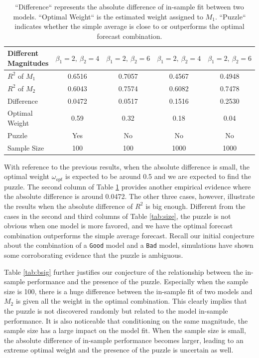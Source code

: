 \documentclass{monashthesis}
\begin{document}
\begin{table}[ht]
  \centering
    \begin{tabular}{l|cccc}
    \toprule
    Different Magnitudes    &  $\beta_1=2,\ \beta_2=4$   &  $\beta_1=2,\ \beta_2=6$ &  $\beta_1=2,\ \beta_2=4$  &  $\beta_1=2,\ \beta_2=6$  \\
    \midrule
    $R^2$ of $M_1$  &    0.6516    &   0.7057   &    0.4567     &   0.4948   \\
    $R^2$ of $M_2$  &    0.6043    &   0.7574   &    0.6082     &   0.7478   \\
    Difference      &    0.0472    &   0.0517   &    0.1516     &   0.2530   \\
    Optimal Weight  &     0.59     &    0.32    &     0.18      &    0.04    \\
    Puzzle          &     Yes      &     No     &      No       &     No     \\
    Sample Size     &     100      &    100     &     1000      &    1000    \\
    \bottomrule
    \end{tabular}
  \caption{``Difference`` represents the absolute difference of in-sample fit between two models. ``Optimal Weight`` is the estimated weight assigned to $M_1$. ``Puzzle`` indicates whether the simple average is close to or outperforms the optimal forecast combination.}
  \label{tab:bmag}
\end{table}

With reference to the previous results, when the absolute difference is small, the optimal weight \(\omega_{opt}\) is expected to be around 0.5 and we are expected to find the puzzle. The second column of Table \ref{tab:bmag} provides another empirical evidence where the absolute difference is around 0.0472. The other three cases, however, illustrate the results when the absolute difference of \(R^2\) is big enough. Different from the cases in the second and third columns of Table \ref{tab:size}, the puzzle is not obvious when one model is more favored, and we have the optimal forecast combination outperforms the simple average forecast. Recall our initial conjecture about the combination of a \texttt{Good} model and a \texttt{Bad} model, simulations have shown some corroborating evidence that the puzzle is ambiguous.

Table \ref{tab:bsig} further justifies our conjecture of the relationship between the in-sample performance and the presence of the puzzle. Especially when the sample size is 100, there is a huge difference between the in-sample fit of two models and \(M_2\) is given all the weight in the optimal combination. This clearly implies that the puzzle is not discovered randomly but related to the model in-sample performance. It is also noticeable that conditioning on the same magnitude, the sample size has a large impact on the model fit. When the sample size is small, the absolute difference of in-sample performance becomes larger, leading to an extreme optimal weight and the presence of the puzzle is uncertain as well.
\end{document}
